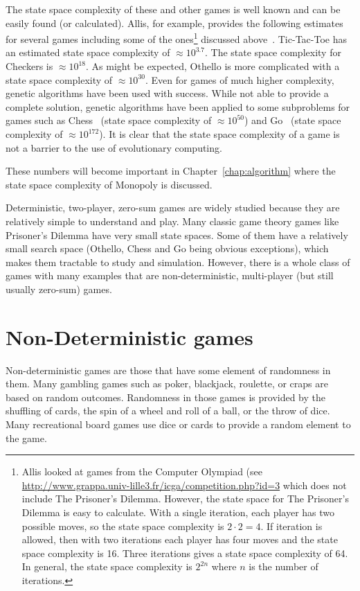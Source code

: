 The state space complexity of these and other games is well known and can be
easily found (or calculated). Allis, for example, provides the following
estimates for several games including some of the ones\footnote{Allis looked at
games from the Computer Olympiad (see
\url{http://www.grappa.univ-lille3.fr/icga/competition.php?id=3} which does not
include The Prisoner's Dilemma. However, the state space for The Prisoner's
Dilemma is easy to calculate. With a single iteration, each player has two
possible moves, so the state space complexity is \(2\cdot2=4\). If iteration is
allowed, then with two iterations each player has four moves and the state space
complexity is 16. Three iterations gives a state space complexity of 64. In
general, the state space complexity is \(2^{2n}\) where \(n\) is the number of
iterations.} discussed above~\cite{Allis1994}. Tic-Tac-Toe has an estimated
state space complexity of \(\approx10^{3.7}\). The state space complexity for
Checkers is \(\approx10^{18}\). As might be expected, Othello is more
complicated with a state space complexity of \(\approx10^{30}\). Even for games
of much higher complexity, genetic algorithms have been used with success. While
not able to provide a complete solution, genetic algorithms have been applied to
some subproblems for games such as Chess~\cite{Mitsuta:2010:OPG:1994486.1994517}
(state space complexity of \(\approx10^{50}\)) and
Go~\cite{shah2012Go,Blackman2009Go} (state space complexity of
\(\approx10^{172}\)). It is clear that the state space complexity of a game is
not a barrier to the use of evolutionary computing.

These numbers will become important in Chapter~\ref{chap:algorithm} where the
state space complexity of Monopoly is discussed.

Deterministic, two-player, zero-sum games are widely studied because they are
relatively simple to understand and play. Many classic game theory games like
Prisoner's Dilemma have very small state spaces. Some of them have a relatively
small search space (Othello, Chess and Go being obvious exceptions), which makes
them tractable to study and simulation. However, there is a whole class of games
with many examples that are non-deterministic, multi-player (but still usually
zero-sum) games.

\section{Non-Deterministic games}

Non-deterministic games are those that have some element of randomness in them.
Many gambling games such as poker, blackjack, roulette, or craps are based
on random outcomes. Randomness in those games is provided by the shuffling of
cards, the spin of a wheel and roll of a ball, or the throw of dice. Many
recreational board games use dice or cards to provide a random element to the
game. 


